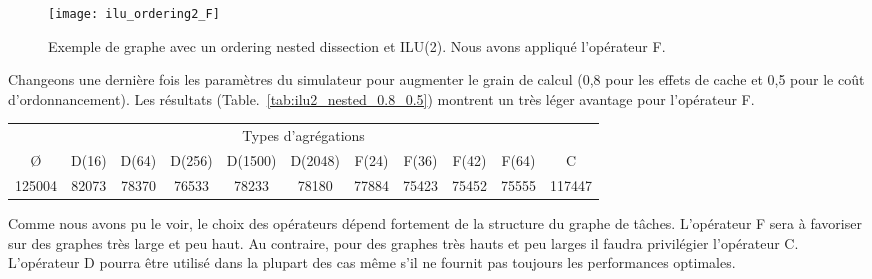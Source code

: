 \begin{figure}[t!]
  \centering
  \texttt{[image: ilu\_ordering2\_F]}
  \caption{Exemple de graphe avec un ordering nested dissection et ILU(2). Nous avons appliqué l'opérateur F.}
  \label{fig:ilu_ordering2_F}
\end{figure}


Changeons une dernière fois les paramètres du simulateur pour augmenter le grain de calcul (0,8 pour les effets de cache et 0,5 pour le coût d'ordonnancement).
%
Les résultats (Table.~\ref{tab:ilu2_nested_0.8_0.5}) montrent un très léger avantage pour l'opérateur F.


\begin{center}
  \begin{tabular}{|c|c|c|c|c|c|c|c|c|c|c|}
    \hline
    \multicolumn{11}{|c|}{Types d'agrégations}\\
    \O & D(16) & D(64) & D(256) & D(1500) & D(2048) & F(24) & F(36) & F(42) & F(64) & C \\
    \hline
    125004 & 82073 & 78370 & 76533 & 78233 & 78180 & 77884 & 75423 & 75452 & 75555 & 117447 \\
    \hline
  \end{tabular}
  \label{tab:ilu2_nested_0.8_0.5}
\end{center}


Comme nous avons pu le voir, le choix des opérateurs dépend fortement de la structure du graphe de tâches.
%
L'opérateur F sera à favoriser sur des graphes très large et peu haut.
%
Au contraire, pour des graphes très hauts et peu larges il faudra privilégier l'opérateur C.
%
L'opérateur D pourra être utilisé dans la plupart des cas même s'il ne fournit pas toujours les performances optimales.

